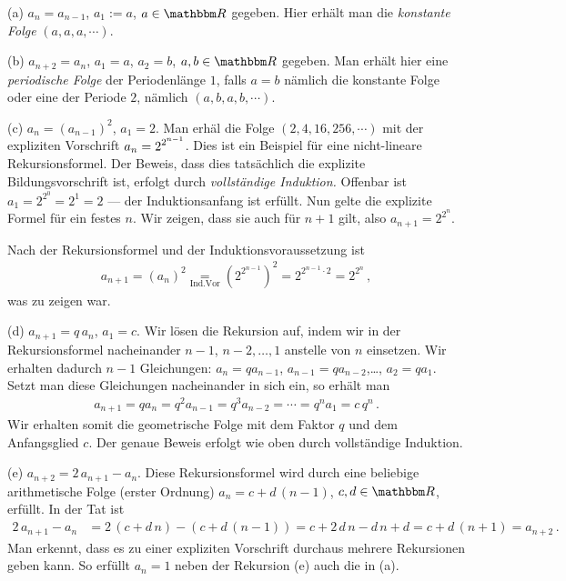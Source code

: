 \documentclass[11pt,a4paper]{article}
\begin{document}
\begin{beispiel}\label{b-1}
(a) $a_n=a_{n-1}$, $a_1:=a$, $a\in \R $ gegeben. Hier erhält man die
  \emph{konstante Folge} $(a,a,a,\cdots)$.

(b) $a_{n+2}=a_{n}$, $a_1=a$, $a_2=b$, $a,b\in\R $ gegeben. Man erhält hier
  eine \emph{periodische Folge} der Periodenlänge $1$, falls $a=b$ nämlich die
  konstante Folge oder eine der Periode $2$, nämlich $(a,b,a,b,\cdots)$.

(c) $a_n=(a_{n-1})^ 2$, $a_1=2$. Man erhäl die Folge $(2,4,16,256,\cdots)$ mit
  der expliziten Vorschrift $\displaystyle a_n=2^{2^{n-1}}$.  Dies ist ein Beispiel für
  eine nicht-lineare Rekursionsformel. Der Beweis, dass dies tatsächlich die
  explizite Bildungsvorschrift ist, erfolgt durch \emph{vollständige
    Induktion.}  Offenbar ist $a_1=2^{2^0}=2^1=2$ --- der Induktionsanfang ist
  erfüllt. Nun gelte die explizite Formel für ein festes $n$. Wir zeigen, dass
  sie auch für $n+1$ gilt, also $a_{n+1}=2^{2^{n}}$.

\begin{beweis} Nach der Rekursionsformel und der Induktionsvoraussetzung ist
\begin{gather*}
  a_{n+1}=(a_n)^2 \underset{\mathrm{Ind.Vor}}{=}\left(2^{2^{n-1}}\right)^2
  =2^{2^{n-1} \cdot 2}= 2^{2^n}\,,
\end{gather*}
was zu zeigen war.
\end{beweis}

(d) $a_{n+1}=q \,a_n$, $a_1=c$.  Wir lösen die Rekursion auf, indem wir in der
Rekursionsformel nacheinander $n-1$, $n-2,\dots, 1$ anstelle von $n$
einsetzen. Wir erhalten dadurch $n-1$ Gleichungen: $a_n=q a_{n-1}$, $a_{n-1}=
qa_{n-2}$,\dots, $a_2 =qa_1$.  Setzt man diese Gleichungen nacheinander in sich
ein, so erhält man
\begin{gather*}
  a_{n+1}=qa_{n}=q^2 a_{n-1} =q^3 a_{n-2}=\cdots =q^{n} a_1= c\, q^n\,.
\end{gather*}
Wir erhalten somit die geometrische Folge mit dem Faktor $q$ und dem 
Anfangsglied $c$. Der genaue Beweis erfolgt wie oben durch vollständige
Induktion.

(e) $a_{n+2}=2\,a_{n+1} -a_n$. Diese Rekursionsformel wird durch eine beliebige
arithmetische Folge (erster Ordnung) $a_n=c +d\,(n-1)$, $c,d\in\R $, erfüllt.
In der Tat ist
\begin{align*}
2\,a_{n+1} -a_n& = 2\,(c+ d\,n) -(c + d\,(n-1))= c+2\,d\,n -d\,n +d = c +
d\,(n+1)= a_{n+2}\,.
\end{align*}
Man erkennt, dass es zu einer expliziten Vorschrift durchaus mehrere
Rekursionen geben kann. So erfüllt $a_n=1$ neben der Rekursion (e) auch die in
(a).


\end{beispiel}
\end{document}
